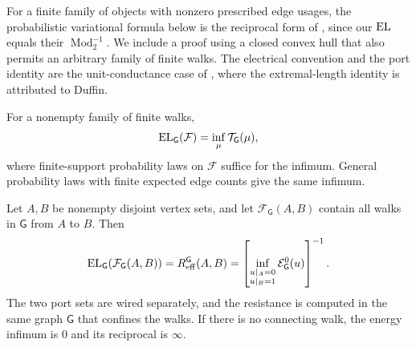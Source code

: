 For a finite family of objects with nonzero prescribed edge usages, the
probabilistic variational formula below is the reciprocal form of
\cite[Theorem~5.1]{AlbinPoggiCorradini2016}, since our \(\operatorname{EL}\) equals
their \(\operatorname{Mod}_2^{-1}\).  We include a proof using a
closed convex hull that also permits an arbitrary family of finite walks.  The
electrical convention and the port identity are the unit-conductance
case of \cite[Propositions~2.2--2.5]{BinderPechersky2025}, where the
extremal-length identity is attributed to Duffin.

\begin{lemma}\label{lem:finite-el}
For a nonempty family of finite walks,
\begin{equation}\label{eq:el-traffic-identity}
 \operatorname{EL}_{\mathsf G}(\mathcal F)
 =\inf_{\mu}\mathcal T_{\mathsf G}(\mu),
\end{equation}
where finite-support probability laws on \(\mathcal F\) suffice for the
infimum.  General probability laws with finite expected edge counts give the
same infimum.

Let \(A,B\) be nonempty disjoint vertex sets, and let
\(\mathcal F_{\mathsf G}(A,B)\) contain all walks in \(\mathsf G\) from
\(A\) to \(B\).  Then
\begin{equation}\label{eq:port-resistance}
 \operatorname{EL}_{\mathsf G}(\mathcal F_{\mathsf G}(A,B))
 =R_{\mathrm{eff}}^{\mathsf G}(A,B)
 =\left[
   \inf_{\substack{u|_A=0\\u|_B=1}}\mathcal E_{\mathsf G}^0(u)
   \right]^{-1}.
\end{equation}
The two port sets are wired separately, and the resistance is computed in
the same graph \(\mathsf G\) that confines the walks.  If there is no
connecting walk, the energy infimum is \(0\) and its reciprocal is
\(\infty\).
\end{lemma}

